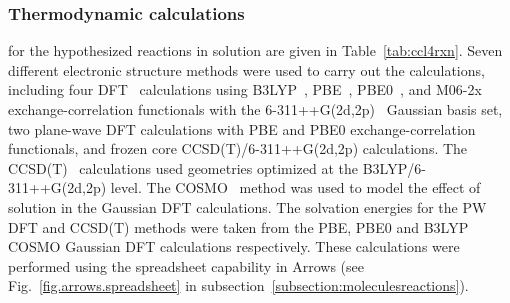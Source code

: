 \documentclass[runningheads,a4paper]{llncs}
\begin{document}
\subsubsection{Thermodynamic calculations} for the hypothesized reactions in solution are given in Table~\ref{tab:ccl4rxn}.  Seven different electronic structure methods were used to carry out the calculations, including four DFT~\cite{hohenberg1964inhomogeneous,kohn1965self} calculations using B3LYP~\cite{beck1993density,lee1988development}, PBE~\cite{perdew1996generalized}, PBE0~\cite{adamo1999toward}, and M06-2x~\cite{zhao2008m06} exchange-correlation functionals with the 6-311++G(2d,2p)~\cite{clark1983a,francl1982a,krishnan1980a,mclean1980a,spitznagel1987a} Gaussian basis set, two plane-wave DFT calculations with PBE and PBE0 exchange-correlation functionals, and frozen core CCSD(T)/6-311++G(2d,2p) calculations.  The CCSD(T)~\cite{bartlett1994applications,bartlett2007coupled} calculations used geometries optimized at the B3LYP/6-311++G(2d,2p) level.  The COSMO~\cite{klamt1993cosmo} method was used to model the effect of solution in the Gaussian DFT calculations.  The solvation energies for the PW DFT and CCSD(T) methods were taken from the PBE, PBE0 and B3LYP COSMO Gaussian DFT calculations respectively.
These calculations were performed using the spreadsheet capability in Arrows (see Fig.~\ref{fig.arrows.spreadsheet} in subsection~\ref{subsection:moleculesreactions}).
\end{document}
